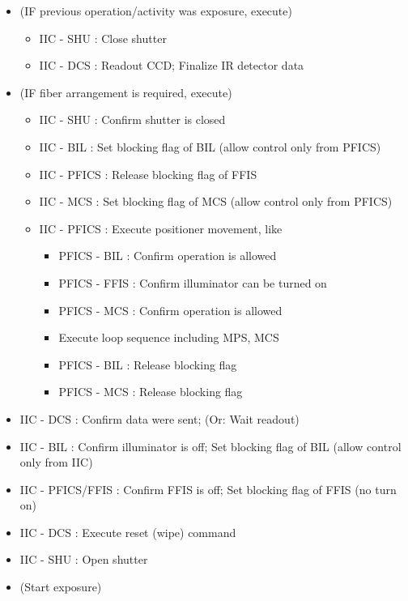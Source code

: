 \documentclass[a4paper,notitlepage]{article}
\begin{document}
\begin{itemize}
  \item (IF previous operation/activity was exposure, execute)
  \begin{itemize}
    \item IIC - SHU : Close shutter
    \item IIC - DCS : Readout CCD; Finalize IR detector data
  \end{itemize}
  \item (IF fiber arrangement is required, execute)
  \begin{itemize}
    \item IIC - SHU : Confirm shutter is closed
    \item IIC - BIL : Set blocking flag of BIL (allow control only from PFICS)
    \item IIC - PFICS : Release blocking flag of FFIS
    \item IIC - MCS : Set blocking flag of MCS (allow control only from PFICS)
    \item IIC - PFICS : Execute positioner movement, like
    \begin{itemize}
      \item PFICS - BIL : Confirm operation is allowed
      \item PFICS - FFIS : Confirm illuminator can be turned on
      \item PFICS - MCS : Confirm operation is allowed
      \item Execute loop sequence including MPS, MCS
      \item PFICS - BIL : Release blocking flag
      \item PFICS - MCS : Release blocking flag
    \end{itemize}
  \end{itemize}
  \item IIC - DCS : Confirm data were sent; (Or: Wait readout)
  \item IIC - BIL : Confirm illuminator is off; Set blocking flag of BIL (allow control only from IIC)
  \item IIC - PFICS/FFIS : Confirm FFIS is off; Set blocking flag of FFIS (no turn on)
  \item IIC - DCS : Execute reset (wipe) command
  \item IIC - SHU : Open shutter
  \item (Start exposure)
\end{itemize}
\end{document}
